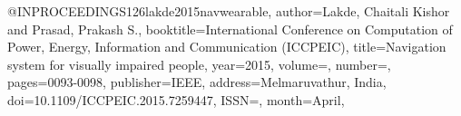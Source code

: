 @INPROCEEDINGS{126lakde2015navwearable,
author={Lakde, Chaitali Kishor and Prasad, Prakash S.},
booktitle={International Conference on Computation of Power, Energy, Information and Communication (ICCPEIC)}, 
title={Navigation system for visually impaired people}, 
year={2015},
volume={},
number={},
pages={0093-0098},
publisher={IEEE},
address={Melmaruvathur, India},
doi={10.1109/ICCPEIC.2015.7259447},
ISSN={},
month={April},}